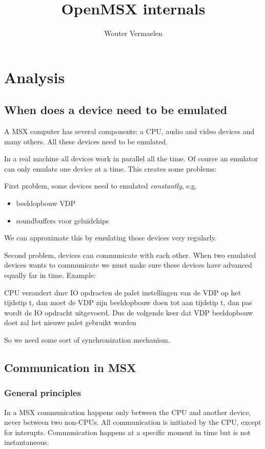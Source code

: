 \documentclass[11pt, a4paper]{report}
\title{OpenMSX internals}
\author{Wouter Vermaelen}
\begin{document}
\maketitle
\tableofcontents

\chapter{Analysis}

\section{When does a device need to be emulated}

A MSX computer has several components: a CPU, audio and video devices and
many others. All these devices need to be emulated.

In a real machine all devices work in parallel all the time. Of cource an
emulator can only emulate one device at a time. This creates some problems:

First problem, some devices need to emulated \textit{constantly}, e.g.
\begin{itemize}
\item beeldopbouw VDP
\item soundbuffers voor geluidchips
\end{itemize}
We can approximate this by emulating those devices very regularly.

Second problem, devices can communicate with each other. When two emulated
devices wants to communicate we must make sure these devices have advanced
equally far in time. Example:

CPU verandert dmv IO opdracten de palet instellingen van de VDP op het 
tijdstip t, dan moet de VDP zijn beeldopbouw doen tot aan tijdstip t, dan
pas wordt de IO opdracht uitgevoerd. Dus de volgende keer dat VDP 
beeldopbouw doet zal het nieuwe palet gebruikt worden

So we need some sort of synchronization mechanism.


\section{Communication in MSX}

\subsection{General principles}

In a MSX communication happens only between the CPU and another device, never
between two non-CPUs. All communication is initiated by the CPU, except for
interupts. Communication happens at a specific moment in time but is not 
instantaneous.
\end{document}
